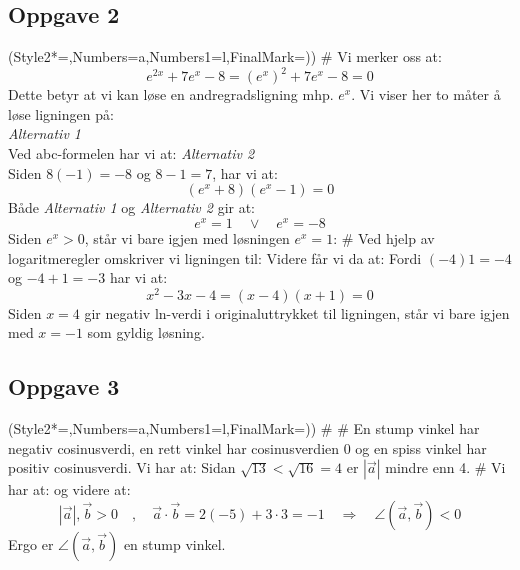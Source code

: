 \subsection*{Oppgave 2}
\begin{easylist}[enumerate]
	\ListProperties(Style2*=,Numbers=a,Numbers1=l,FinalMark={)})
	# Vi merker oss at:
	\[ e^{2x}+7e^x -8 = \left(e^ x\right)^2 + 7e^x - 8 =0\]
	Dette betyr at vi kan løse en andregradsligning mhp. $ e^x $. Vi viser her to måter å løse ligningen på:\\[11pt]
	\textit{Alternativ 1} \\
	Ved abc-formelen har vi at:
\textit{Alternativ 2}\\
Siden $ 8(-1)=-8 $ og $ 8-1=7 $, har vi at:
\[ (e^x +8)(e^x-1)=0 \]
Både \textit{Alternativ 1} og \textit{Alternativ 2} gir at:
\[ e^x = 1\quad\vee\quad e^x = -8 \]
Siden $ e^x > 0 $, står vi bare igjen med løsningen $ e^x=1 $:
# Ved hjelp av logaritmeregler omskriver vi ligningen til:
Videre får vi da at:
Fordi $ (-4)1 =-4 $ og $ -4+1=-3 $ har vi at:
\[ x^2-3x-4 = (x-4)(x+1)=0 \]
Siden $ x=4 $ gir negativ ln-verdi i originaluttrykket til ligningen, står vi bare igjen med $ x=-1 $ som gyldig løsning.
\end{easylist}

\subsection*{Oppgave 3}
\begin{easylist}[enumerate]
	\ListProperties(Style2*=,Numbers=a,Numbers1=l,FinalMark={)})
	#  
	# En stump vinkel har negativ cosinusverdi, en rett vinkel har cosinusverdien 0 og en spiss vinkel har positiv cosinusverdi. Vi har at: 
Sidan $ \sqrt{13}<\sqrt{16}=4 $ er $ |\vec{a}| $ mindre enn 4.
	# Vi har at:
og videre at:
\[ |\vec{a}|, \vec{b} > 0\quad,\quad\vec{a}\cdot\vec{b}=2(-5)+3\cdot3=-1\quad \Rightarrow\quad \angle(\vec{a}, \vec{b}) <0 \]
Ergo er $ \angle(\vec{a}, \vec{b}) $ en stump vinkel.
\end{easylist}


